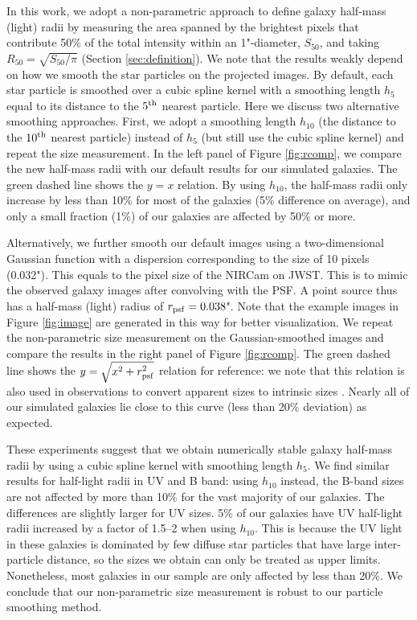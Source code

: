 \documentclass[useAMS,usenatbib]{mn2e}
\begin{document}
In this work, we adopt a non-parametric approach to define galaxy half-mass (light) radii by measuring the area spanned by the brightest pixels that contribute 50\% of the total intensity within an 1"-diameter, $S_{50}$, and taking $R_{50}=\sqrt{S_{50}/\pi}$ (Section \ref{sec:definition}). We note that the results weakly depend on how we smooth the star particles on the projected images. By default, each star particle is smoothed over a cubic spline kernel with a smoothing length $h_5$ equal to its distance to the $5^{\rm th}$ nearest particle. Here we discuss two alternative smoothing approaches. First, we adopt a smoothing length $h_{10}$ (the distance to the $10^{\rm th}$ nearest particle) instead of $h_5$ (but still use the cubic spline kernel) and repeat the size measurement. In the left panel of Figure \ref{fig:rcomp}, we compare the new half-mass radii with our default results for our simulated galaxies. The green dashed line shows the $y=x$ relation. By using $h_{10}$, the half-mass radii only increase by less than 10\% for most of the galaxies (5\% difference on average), and only a small fraction (1\%) of our galaxies are affected by 50\% or more.

Alternatively, we further smooth our default images using a two-dimensional Gaussian function with a dispersion corresponding to the size of 10 pixels (0.032"). This equals to the pixel size of the NIRCam on JWST. This is to mimic the observed galaxy images after convolving with the PSF. A point source thus has a half-mass (light) radius of $r_{\rm psf}=0.038$". Note that the example images in Figure \ref{fig:image} are generated in this way for better visualization. We repeat the non-parametric size measurement on the Gaussian-smoothed images and compare the results in the right panel of Figure \ref{fig:rcomp}. The green dashed line shows the $y=\sqrt{x^2+r_{\rm psf}^2}$ relation for reference: we note that this relation is also used in observations to convert apparent sizes to intrinsic sizes \citep[e.g.][]{oesch.2010:hudf.morphology}. Nearly all of our simulated galaxies lie close to this curve (less than 20\% deviation) as expected. 

These experiments suggest that we obtain numerically stable galaxy half-mass radii by using a cubic spline kernel with smoothing length $h_5$. We find similar results for half-light radii in UV and B band: using $h_{10}$ instead, the B-band sizes are not affected by more than 10\% for the vast majority of our galaxies. The differences are slightly larger for UV sizes. 5\% of our galaxies have UV half-light radii increased by a factor of 1.5--2 when using $h_{10}$. This is because the UV light in these galaxies is dominated by few diffuse star particles that have large inter-particle distance, so the sizes we obtain can only be treated as upper limits. Nonetheless, most galaxies in our sample are only affected by less than 20\%. We conclude that our non-parametric size measurement is robust to our particle smoothing method.
\end{document}
